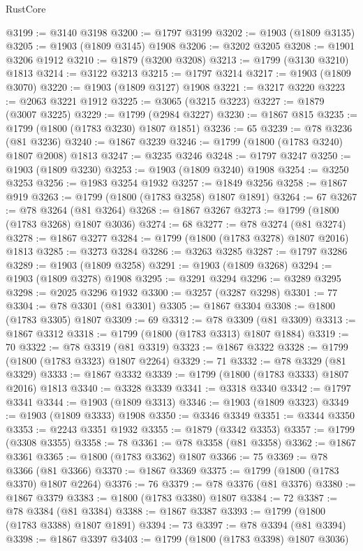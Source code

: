 \begin{lexlean}{RustCore}
\begin{coremodule}
@3199 := @3140 @3198
@3200 := @1797 @3199
@3202 := @1903 (@1809 @3135)
@3205 := @1903 (@1809 @3145) @1908
@3206 := @3202 @3205
@3208 := @1901 @3206 @1912
@3210 := @1879 (@3200 @3208)
@3213 := @1799 (@3130 @3210) @1813
@3214 := @3122 @3213
@3215 := @1797 @3214
@3217 := @1903 (@1809 @3070)
@3220 := @1903 (@1809 @3127) @1908
@3221 := @3217 @3220
@3223 := @2063 @3221 @1912
@3225 := @3065 (@3215 @3223)
@3227 := @1879 (@3007 @3225)
@3229 := @1799 (@2984 @3227)
@3230 := @1867 @815
@3235 := @1799 (@1800 (@1783 @3230) @1807 @1851)
@3236 := 65
@3239 := @78 @3236 (@81 @3236)
@3240 := @1867 @3239
@3246 := @1799 (@1800 (@1783 @3240) @1807 @2008) @1813
@3247 := @3235 @3246
@3248 := @1797 @3247
@3250 := @1903 (@1809 @3230)
@3253 := @1903 (@1809 @3240) @1908
@3254 := @3250 @3253
@3256 := @1983 @3254 @1932
@3257 := @1849 @3256
@3258 := @1867 @919
@3263 := @1799 (@1800 (@1783 @3258) @1807 @1891)
@3264 := 67
@3267 := @78 @3264 (@81 @3264)
@3268 := @1867 @3267
@3273 := @1799 (@1800 (@1783 @3268) @1807 @3036)
@3274 := 68
@3277 := @78 @3274 (@81 @3274)
@3278 := @1867 @3277
@3284 := @1799 (@1800 (@1783 @3278) @1807 @2016) @1813
@3285 := @3273 @3284
@3286 := @3263 @3285
@3287 := @1797 @3286
@3289 := @1903 (@1809 @3258)
@3291 := @1903 (@1809 @3268)
@3294 := @1903 (@1809 @3278) @1908
@3295 := @3291 @3294
@3296 := @3289 @3295
@3298 := @2025 @3296 @1932
@3300 := @3257 (@3287 @3298)
@3301 := 77
@3304 := @78 @3301 (@81 @3301)
@3305 := @1867 @3304
@3308 := @1800 (@1783 @3305) @1807
@3309 := 69
@3312 := @78 @3309 (@81 @3309)
@3313 := @1867 @3312
@3318 := @1799 (@1800 (@1783 @3313) @1807 @1884)
@3319 := 70
@3322 := @78 @3319 (@81 @3319)
@3323 := @1867 @3322
@3328 := @1799 (@1800 (@1783 @3323) @1807 @2264)
@3329 := 71
@3332 := @78 @3329 (@81 @3329)
@3333 := @1867 @3332
@3339 := @1799 (@1800 (@1783 @3333) @1807 @2016) @1813
@3340 := @3328 @3339
@3341 := @3318 @3340
@3342 := @1797 @3341
@3344 := @1903 (@1809 @3313)
@3346 := @1903 (@1809 @3323)
@3349 := @1903 (@1809 @3333) @1908
@3350 := @3346 @3349
@3351 := @3344 @3350
@3353 := @2243 @3351 @1932
@3355 := @1879 (@3342 @3353)
@3357 := @1799 (@3308 @3355)
@3358 := 78
@3361 := @78 @3358 (@81 @3358)
@3362 := @1867 @3361
@3365 := @1800 (@1783 @3362) @1807
@3366 := 75
@3369 := @78 @3366 (@81 @3366)
@3370 := @1867 @3369
@3375 := @1799 (@1800 (@1783 @3370) @1807 @2264)
@3376 := 76
@3379 := @78 @3376 (@81 @3376)
@3380 := @1867 @3379
@3383 := @1800 (@1783 @3380) @1807
@3384 := 72
@3387 := @78 @3384 (@81 @3384)
@3388 := @1867 @3387
@3393 := @1799 (@1800 (@1783 @3388) @1807 @1891)
@3394 := 73
@3397 := @78 @3394 (@81 @3394)
@3398 := @1867 @3397
@3403 := @1799 (@1800 (@1783 @3398) @1807 @3036)

\end{coremodule}
\end{lexlean}
